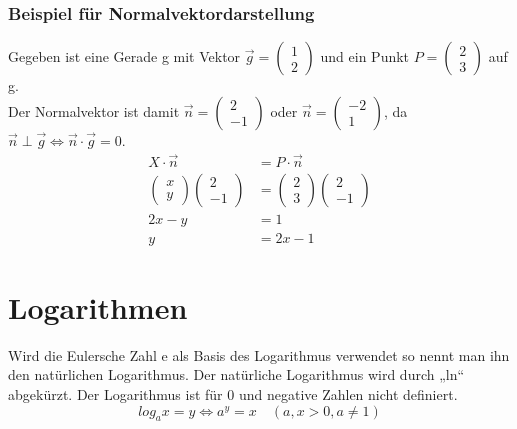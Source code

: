 \documentclass[a4paper]{article}
\begin{document}
\subsubsection{Beispiel für Normalvektordarstellung}
Gegeben ist eine Gerade g mit Vektor $\vec g = \begin{pmatrix}1\\2\end{pmatrix}$ und ein Punkt $P=\begin{pmatrix}2\\3\end{pmatrix}$ auf g.\\
Der Normalvektor ist damit $\vec n = \begin{pmatrix}2\\-1\end{pmatrix}$ oder $\vec n = \begin{pmatrix}-2\\1\end{pmatrix}$, da $ \vec n \perp \vec g \Leftrightarrow \vec n \cdot \vec g=0$.\\
\begin{align*}
X \cdot \vec n&=P \cdot \vec n \\
\begin{pmatrix}x\\y\end{pmatrix}\begin{pmatrix}2\\-1\end{pmatrix}&=\begin{pmatrix}2\\3\end{pmatrix}\begin{pmatrix}2\\-1\end{pmatrix} \\
2x-y&=1 \\
y&=2x-1
\end{align*} 

\section{Logarithmen}
Wird die Eulersche Zahl e als Basis des Logarithmus verwendet so nennt man ihn den natürlichen Logarithmus. Der natürliche Logarithmus wird durch „ln“ abgekürzt. Der Logarithmus ist für 0 und negative Zahlen nicht definiert.
\[
log_a x =y \Leftrightarrow a^y=x \quad (a,x > 0, a \neq 1)
\]
\end{document}
